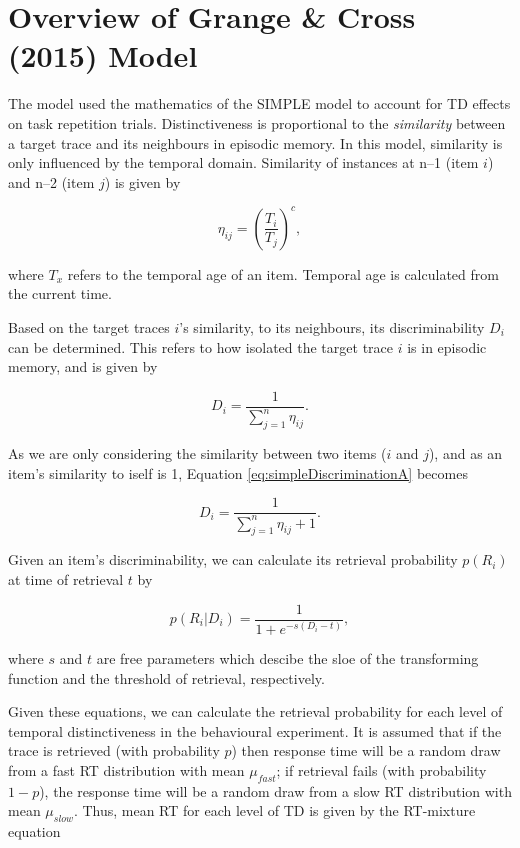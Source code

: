 \documentclass[a4paper, jou, natbib]{apa6}
\begin{document}
\section{Overview of Grange \& Cross (2015) Model}
The \citet{Grange2015} model used the mathematics of the SIMPLE \cite{Brown2007} model to account for TD effects on task repetition trials. Distinctiveness is proportional to the \emph{similarity} between a target trace and its neighbours in episodic memory. In this model, similarity is only influenced by the temporal domain. Similarity of instances at n--1 (item $i$) and n--2 (item $j$) is given by

\begin{equation}
\eta_{ij} = \left(\frac{T_{i}}{T_{j}}\right)^{c}, 
\label{eq:simpleSimilarity}
\end{equation}

\noindent where $T_{x}$ refers to the temporal age of an item. Temporal age is calculated from the current time. 

Based on the target traces $i$'s similarity, to its neighbours, its discriminability $D_{i}$ can be determined. This refers to how isolated the target trace $i$ is in episodic memory, and is given by

\begin{equation}
D_{i} = \frac{1}{\sum\limits_{j = 1}^n \eta_{ij}}.
\label{eq:simpleDiscriminationA}
\end{equation}

As we are only considering the similarity between two items ($i$ and $j$), and as an item's similarity to iself is 1, Equation \ref{eq:simpleDiscriminationA} becomes

\begin{equation}
D_{i} = \frac{1}{\sum\limits_{j = 1}^n \eta_{ij} + 1}.
\label{eq:simpleDiscriminationB}
\end{equation}

Given an item's discriminability, we can calculate its retrieval probability $p(R_{i})$ at time of retrieval $t$ by

\begin{equation}
p(R_{i}|D_{i}) = \frac{1}{1 + e^{-s(D_{i} - t)}}, 
\label{eq:simpleProb}
\end{equation}

\noindent where $s$ and $t$ are free parameters which descibe the sloe of the transforming function and the threshold of retrieval, respectively. 

Given these equations, we can calculate the retrieval probability for each level of temporal distinctiveness in the behavioural experiment. It is assumed that if the trace is retrieved (with probability $p$) then response time will be a random draw from a fast RT distribution with mean $\mu_{fast}$; if retrieval fails (with probability $1 - p$), the response time will be a random draw from a slow RT distribution with mean $\mu_{slow}$. Thus, mean RT for each level of TD is given by the RT-mixture equation
\end{document}

